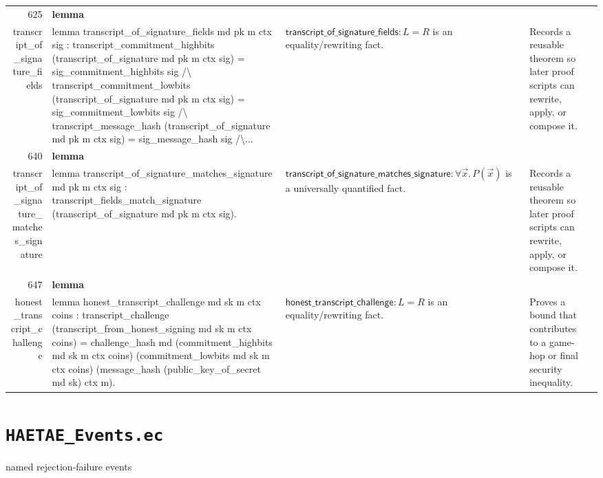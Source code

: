 \documentclass[10pt]{article}
\newcommand{\ec}[1]{\begingroup\ttfamily\scriptsize #1\endgroup}
\begin{document}
\begin{longtable}{r L{0.17\textwidth} L{0.26\textwidth} L{0.27\textwidth} L{0.20\textwidth}}
625 & \textbf{lemma}\\\ec{transcript\_of\_signature\_fields} & \ec{lemma transcript\_of\_signature\_fields md pk m ctx sig : transcript\_commitment\_highbits (transcript\_of\_signature md pk m ctx sig) = sig\_commitment\_highbits sig /\textbackslash{} transcript\_commitment\_lowbits (transcript\_of\_signature md pk m ctx sig) = sig\_commitment\_lowbits sig /\textbackslash{} transcript\_message\_hash (transcript\_of\_signature md pk m ctx sig) = sig\_message\_hash sig /\textbackslash{}...} & \(\mathsf{transcript\_of\_signature\_fields} : L = R\) is an equality/rewriting fact. & Records a reusable theorem so later proof scripts can rewrite, apply, or compose it. \\
640 & \textbf{lemma}\\\ec{transcript\_of\_signature\_matches\_signature} & \ec{lemma transcript\_of\_signature\_matches\_signature md pk m ctx sig : transcript\_fields\_match\_signature (transcript\_of\_signature md pk m ctx sig).} & \(\mathsf{transcript\_of\_signature\_matches\_signature} : \forall \vec{x}.\, P(\vec{x})\) is a universally quantified fact. & Records a reusable theorem so later proof scripts can rewrite, apply, or compose it. \\
647 & \textbf{lemma}\\\ec{honest\_transcript\_challenge} & \ec{lemma honest\_transcript\_challenge md sk m ctx coins : transcript\_challenge (transcript\_from\_honest\_signing md sk m ctx coins) = challenge\_hash md (commitment\_highbits md sk m ctx coins) (commitment\_lowbits md sk m ctx coins) (message\_hash (public\_key\_of\_secret md sk) ctx m).} & \(\mathsf{honest\_transcript\_challenge} : L = R\) is an equality/rewriting fact. & Proves a bound that contributes to a game-hop or final security inequality. \\
\bottomrule
\end{longtable}

\clearpage
\section{\texorpdfstring{\texttt{HAETAE\_Events.ec}}{HAETAE Events.ec}}
named rejection-failure events
\end{document}
